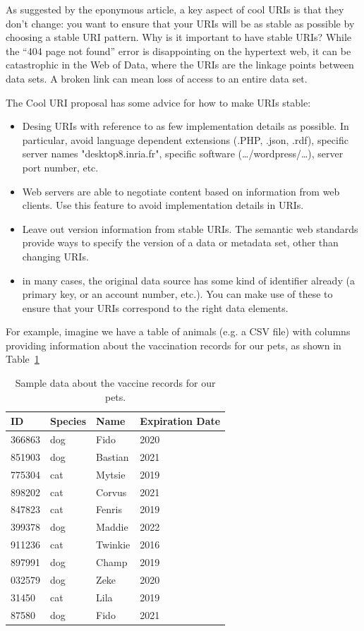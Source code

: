As suggested by the eponymous article, a key aspect of cool URIs is that they don't change: you want to ensure
that your URIs will be as stable as possible by choosing a stable URI pattern. 
Why is it important to have stable URIs?  
While the ``404 page not found'' error is disappointing on the hypertext web, it can be catastrophic in the Web of Data, where the URIs are the
linkage points between data sets.  A broken link can mean loss of access to an entire data set.

The Cool URI proposal has some advice for how to make URIs stable:

\begin{itemize}
    \item Desing URIs with reference to as few implementation details as possible. In particular, avoid language dependent extensions (.PHP, .json, .rdf), specific server names "desktop8.inria.fr", specific software (\ldots{}/wordpress/\ldots{}), server port number, etc.  
    \item Web servers are able to negotiate content based on information from web clients. Use this feature to avoid implementation details in URIs.
    \item Leave out version information from stable URIs.  The semantic web standards provide ways to specify the version of a data or metadata set, other than changing URIs. 
    \item in many cases, the original data source has some kind of identifier already (a primary key, or an account number, etc.).  You can make use of these to ensure that your URIs correspond to the right data elements. 
\end{itemize}



For example, imagine  we have a table of animals (e.g. a CSV file) with columns
providing information about the vaccination records for our pets, as shown in Table~\ref{tab:ch5.pets}

\begin{table}
    \centering
    \begin{tabular}{|l l l l|}
    \hline
    ID&Species&Name&Expiration Date \\
    \hline\hline
366863&dog&Fido&2020 \\
851903&dog&Bastian&2021 \\
775304&cat&Mytsie&2019 \\
898202&cat&Corvus&2021 \\
847823&cat&Fenris&2019 \\
399378&dog&Maddie&2022 \\
911236&cat&Twinkie&2016 \\
897991&dog&Champ&2019 \\
032579&dog&Zeke&2020 \\
31450&cat&Lila&2019 \\
87580&dog&Fido&2021 \\
\hline
    \end{tabular}
    \caption{Sample data about the vaccine records for our pets. }
    \label{tab:ch5.pets}
\end{table}


